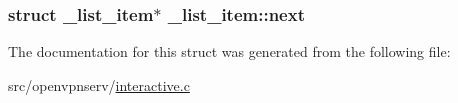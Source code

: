 \subsubsection[{next}]{\setlength{\rightskip}{0pt plus 5cm}struct {\bf \+\_\+list\+\_\+item}$\ast$ \+\_\+list\+\_\+item\+::next}\label{struct__list__item_a981935f42bb92000481bdf9ddbefa16e}


The documentation for this struct was generated from the following file\+:\begin{DoxyCompactItemize}
\item 
src/openvpnserv/\hyperlink{interactive_8c}{interactive.\+c}\end{DoxyCompactItemize}
